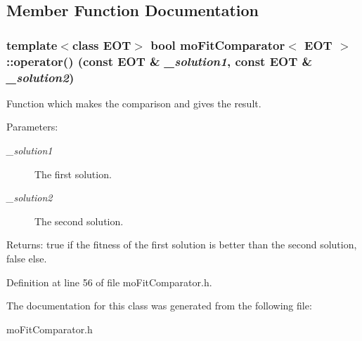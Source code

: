 \subsection{Member Function Documentation}
\subsubsection{\setlength{\rightskip}{0pt plus 5cm}template$<$class EOT$>$ bool \bf{mo\-Fit\-Comparator}$<$ EOT $>$::operator() (const EOT \& {\em \_\-solution1}, const EOT \& {\em \_\-solution2})\hspace{0.3cm}{\tt  [inline]}}\label{classmo_fit_comparator_c920d5a49deb16710daf1e5fcde6b16c}


Function which makes the comparison and gives the result. 

\begin{Desc}
\item[Parameters:]
\begin{description}
\item[{\em \_\-solution1}]The first solution. \item[{\em \_\-solution2}]The second solution. \end{description}
\end{Desc}
\begin{Desc}
\item[Returns:]true if the fitness of the first solution is better than the second solution, false else. \end{Desc}


Definition at line 56 of file mo\-Fit\-Comparator.h.

The documentation for this class was generated from the following file:\begin{CompactItemize}
\item 
mo\-Fit\-Comparator.h\end{CompactItemize}
